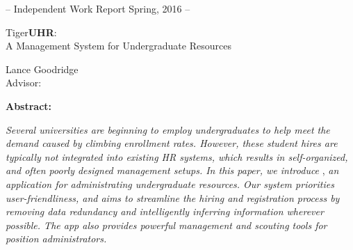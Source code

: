 \begin{center}
    \small{-- Independent Work Report Spring, 2016 --}
\end{center}

\vspace{1in}

\begin{center}
    \huge{Tiger\textbf{UHR}:} \\
    \vspace{0.1in}
    \large{A Management System for Undergraduate Resources}
\end{center}

\vspace{1in}

\begin{center}
    \Large{Lance Goodridge} \\
    \vspace{0.1in}
    \large{Advisor: \advisor} \\
\end{center}

\vspace{1in}

\begin{center}
    \textbf{Abstract:}
\end{center}
\textit{Several universities are beginning to employ undergraduates to help meet the demand caused by climbing enrollment rates. However, these student hires are typically not integrated into existing HR systems, which results in self-organized, and often poorly designed management setups. In this paper, we introduce} \tigeruhr{}, \textit{an application for administrating undergraduate resources. Our system priorities user-friendliness, and aims to streamline the hiring and registration process by removing data redundancy and intelligently inferring information wherever possible. The app also provides powerful management and scouting tools for position administrators.}

\thispagestyle{empty}

\newpage
\tableofcontents
\newpage
\doublespacing
